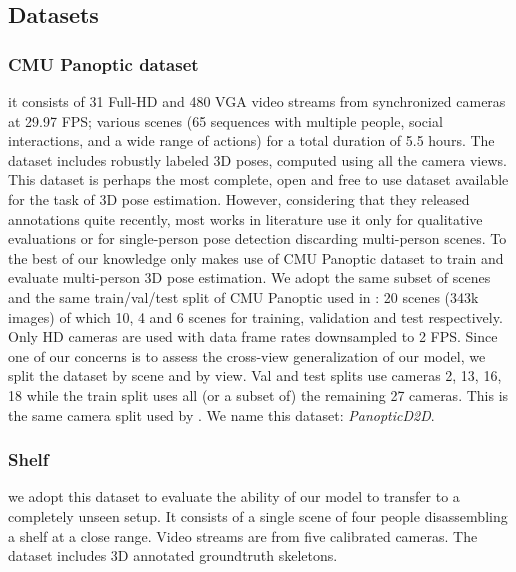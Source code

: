 \documentclass[a4paper,conference]{IEEEtran}
\begin{document}
\subsection{Datasets}

\subsubsection{CMU Panoptic dataset \cite{joo2015panoptic}} it consists of 31 Full-HD and 480 VGA video streams from synchronized cameras at 29.97 FPS; various scenes (65 sequences with multiple people, social interactions, and a wide range of actions) for a total duration of 5.5 hours. The dataset includes robustly labeled 3D poses, computed using all the camera views. This dataset is perhaps the most complete, open and free to use dataset available for the task of 3D pose estimation. However, considering that they released annotations quite recently, most works in literature use it only for qualitative evaluations \cite{dong2019fast} or for single-person pose detection \cite{iskakov2019learnable} discarding multi-person scenes. To the best of our knowledge only \cite{pirinen2019domes} makes use of CMU Panoptic dataset to train and evaluate multi-person 3D pose estimation. We adopt the same subset of scenes and the same train/val/test split of CMU Panoptic used in \cite{pirinen2019domes}: 20 scenes (343k images)  of which 10, 4 and 6 scenes for training, validation and test respectively. Only HD cameras are used with data frame rates downsampled to 2 FPS. Since one of our concerns is to assess the cross-view generalization of our model, we split the dataset by scene and by view. Val and test splits use cameras 2, 13, 16, 18 while the train split uses all (or a subset of) the remaining 27 cameras. This is the same camera split used by \cite{iskakov2019learnable}. We name this dataset: \textit{PanopticD2D}.

\subsubsection{Shelf \cite{belagiannis20143d}} we adopt this dataset to evaluate the ability of our model to transfer to a completely unseen setup. It consists of a single scene of four people disassembling a shelf at a close range. Video streams are from five calibrated cameras. The dataset includes 3D annotated groundtruth skeletons.
\end{document}

